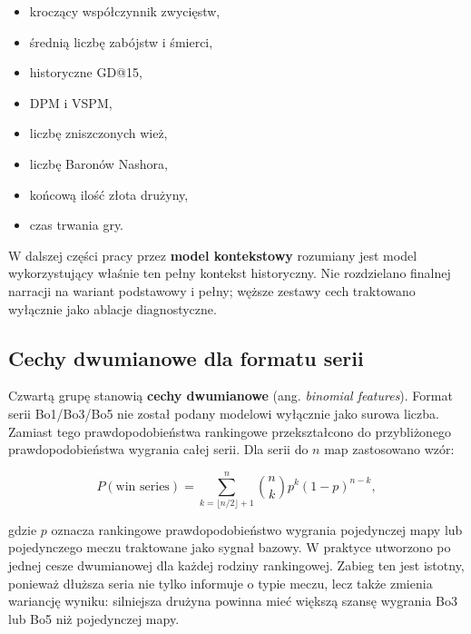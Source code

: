 \begin{itemize}
    \item kroczący współczynnik zwycięstw,
    \item średnią liczbę zabójstw i śmierci,
    \item historyczne GD@15,
    \item DPM i VSPM,
    \item liczbę zniszczonych wież,
    \item liczbę Baronów Nashora,
    \item końcową ilość złota drużyny,
    \item czas trwania gry.
\end{itemize}

W dalszej części pracy przez \textbf{model kontekstowy} rozumiany jest model wykorzystujący właśnie ten pełny kontekst historyczny. Nie rozdzielano finalnej narracji na wariant podstawowy i pełny; węższe zestawy cech traktowano wyłącznie jako ablacje diagnostyczne.

\subsection{Cechy dwumianowe dla formatu serii}

Czwartą grupę stanowią \textbf{cechy dwumianowe} (ang. \textit{binomial features}). Format serii Bo1/Bo3/Bo5 nie został podany modelowi wyłącznie jako surowa liczba. Zamiast tego prawdopodobieństwa rankingowe przekształcono do przybliżonego prawdopodobieństwa wygrania całej serii. Dla serii do $n$ map zastosowano wzór:

\[
    P(\text{win series}) = \sum_{k=\lfloor n/2 \rfloor + 1}^{n}
    \binom{n}{k} p^k (1-p)^{n-k},
\]

gdzie $p$ oznacza rankingowe prawdopodobieństwo wygrania pojedynczej mapy lub pojedynczego meczu traktowane jako sygnał bazowy. W praktyce utworzono po jednej cesze dwumianowej dla każdej rodziny rankingowej. Zabieg ten jest istotny, ponieważ dłuższa seria nie tylko informuje o typie meczu, lecz także zmienia wariancję wyniku: silniejsza drużyna powinna mieć większą szansę wygrania Bo3 lub Bo5 niż pojedynczej mapy.

